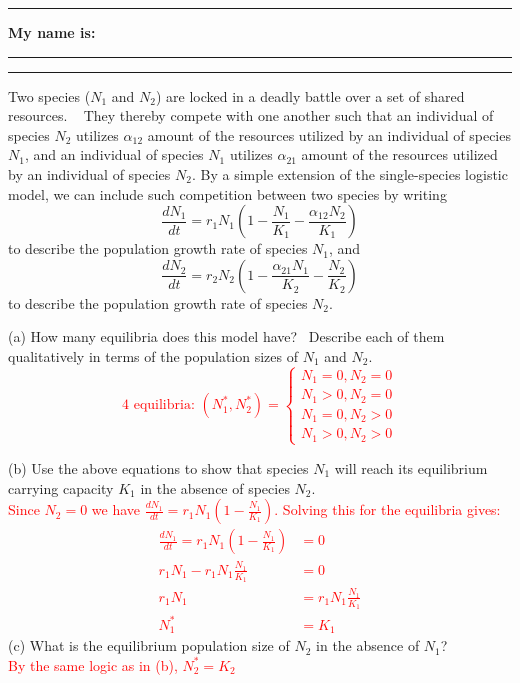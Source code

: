 \documentclass{article}
\newcommand*{\blanks}[1][4em]{\rule{#1}{.4pt}}
\begin{document}
\noindent{}

\rule[0.5ex]{\linewidth}{1pt}
\begin{center}
	\textbf{My name is:} \blanks[150pt]
\end{center}
\rule[0.5ex]{\linewidth}{1pt}

Two species ($N_1$ and $N_2$) are locked in a deadly battle over a set of shared resources.   They thereby compete with one another such that an individual of species $N_2$ utilizes $\alpha_{12}$ amount of the resources utilized by an individual of species $N_1$, and an individual of species $N_1$ utilizes $\alpha_{21}$ amount of the resources utilized by an individual of species $N_2$.  By a simple extension of the single-species logistic model, we can include such competition between two species by writing
\begin{equation*}
	\frac{dN_1}{dt}=r_1 N_1 \left( 1-\frac{N_1}{K_1}-\frac{\alpha_{12}N_2}{K_1} \right )
\end{equation*}
to describe the population growth rate of species $N_1$, and
\begin{equation*}
	\frac{dN_2}{dt}=r_2 N_2 \left( 1-\frac{\alpha_{21}N_1}{K_2}-\frac{N_2}{K_2} \right )
\end{equation*}
to describe the population growth rate of species $N_2$.


(a) How many equilibria does this model have?  Describe each of them qualitatively in terms of the population sizes of $N_1$ and $N_2$.\\
\textcolor{red}{
\begin{equation*}
	\text{4 equilibria:  } (N_1^*,N_2^*)=\begin{cases}
	N_1=0,N_2=0\\
	N_1>0,N_2=0\\
	N_1=0,N_2>0\\
	N_1>0,N_2>0
	\end{cases}
\end{equation*}
}

(b) Use the above equations to show that species $N_1$ will reach its equilibrium carrying capacity $K_1$ in the absence of species $N_2$.\\
\textcolor{red}{
Since $N_2=0$ we have $\frac{dN_1}{dt}=r_1 N_1 \left( 1-\frac{N_1}{K_1}\right )$.  Solving this for the equilibria gives:
\begin{align*}
	\frac{dN_1}{dt}=r_1 N_1 \left( 1-\frac{N_1}{K_1}\right ) &= 0\\
	r_1 N_1 - r_1 N_1 \frac{N_1}{K_1} & = 0\\
	r_1 N_1 &=r_1 N_1 \frac{N_1}{K_1}\\
	N_1^* &= K_1
\end{align*}
}
(c) What is the equilibrium population size of $N_2$ in the absence of $N_1$?\\
\textcolor{red}{By the same logic as in (b), $N_2^* = K_2$}
\vspace{0.5cm}
\end{document}
